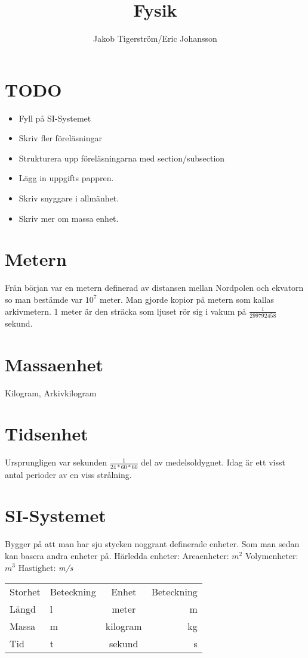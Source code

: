 \documentclass[a4paper,11pt]{article}
\title{Fysik}
\author{Jakob Tigerström/Eric Johansson}
\begin{document}
\maketitle
\tableofcontents
\newpage
\begin{flushleft}
\section{TODO}
\begin{itemize}
  \item Fyll på SI-Systemet
  \item Skriv fler föreläsningar
  \item Strukturera upp föreläsningarna med section/subsection
  \item Lägg in uppgifts pappren.
  \item Skriv snyggare i allmänhet.
  \item Skriv mer om massa enhet.
\end{itemize}
\section{Metern}
Från början var en metern definerad av distansen mellan Nordpolen och ekvatorn so man bestämde var $ 10^7 $ meter.
Man gjorde kopior på metern som kallas arkivmetern.
1 meter är den sträcka som ljuset rör sig i vakum på $ \frac{1}{299792458} $ sekund.
\newline
\newline
\section{Massaenhet}
Kilogram, Arkivkilogram
\newline
\newline
\section{Tidsenhet}
Ursprungligen var sekunden $ \frac{1}{24*60*60} $ del av medelsoldygnet.
\newline
Idag är ett visst antal perioder av en viss strålning.
\newline
\newline
\section{SI-Systemet}
Bygger på att man har sju stycken noggrant definerade enheter. Som man sedan kan basera andra enheter på.
\newline
Härledda enheter:\newline
Areaenheter: $ m^2 $\newline
Volymenheter: $ m^3 $\newline
Hastighet:  \textit{m/s}\newline
\begin{tabular}{l l | c r}
  Storhet & Beteckning & Enhet & Beteckning\\
  Längd & l & meter & m\\
  Massa & m & kilogram & kg\\
  Tid & t & sekund & s\\
\end{tabular}


\end{flushleft}
\end{document}
